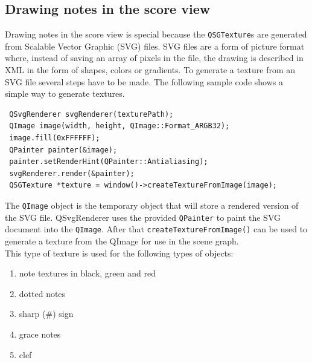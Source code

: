 \subsection{Drawing notes in the score view}
Drawing notes in the score view is special because the {\tt QSGTexture}s are 
generated from Scalable Vector Graphic (SVG) files. SVG files are a form of picture format where, instead of saving an array of pixels in the file, the drawing is described in XML in the form of shapes, colors or gradients. To generate a texture from an SVG file several steps have to be made. The following sample code shows a simple way to generate textures.
\begin{lstlisting}
 QSvgRenderer svgRenderer(texturePath);
 QImage image(width, height, QImage::Format_ARGB32);
 image.fill(0xFFFFFF);
 QPainter painter(&image);
 painter.setRenderHint(QPainter::Antialiasing);
 svgRenderer.render(&painter);
 QSGTexture *texture = window()->createTextureFromImage(image);
\end{lstlisting}

The {\tt QImage} object is the temporary object that will store a rendered version of the SVG file. {QSvgRenderer} uses the provided {\tt QPainter} to paint the SVG document into the {\tt QImage}. After that {\tt createTextureFromImage()} can be used to generate a texture from the QImage for use in the scene graph.
\\
This type of texture is used for the following types of objects:
\begin{enumerate}
\item note textures in black, green and red
\item dotted notes
\item sharp (\#) sign
\item grace notes
\item clef
\end{enumerate}

